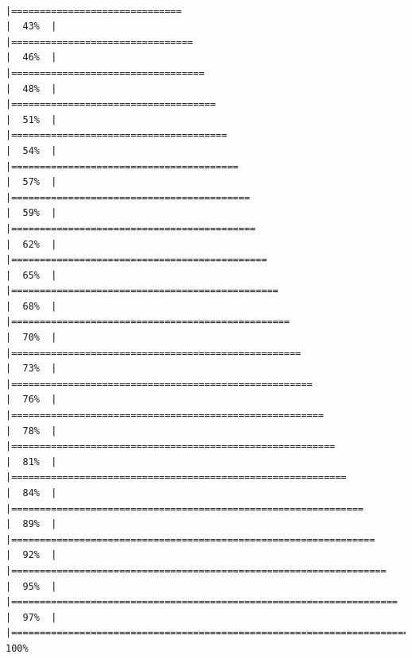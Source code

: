 \documentclass[
]{article}
\begin{document}
\begin{verbatim}
                                                                    |==============================                                        |  43%  |                                                                              |================================                                      |  46%  |                                                                              |==================================                                    |  48%  |                                                                              |====================================                                  |  51%  |                                                                              |======================================                                |  54%  |                                                                              |========================================                              |  57%  |                                                                              |==========================================                            |  59%  |                                                                              |===========================================                           |  62%  |                                                                              |=============================================                         |  65%  |                                                                              |===============================================                       |  68%  |                                                                              |=================================================                     |  70%  |                                                                              |===================================================                   |  73%  |                                                                              |=====================================================                 |  76%  |                                                                              |=======================================================               |  78%  |                                                                              |=========================================================             |  81%  |                                                                              |===========================================================           |  84%  |                                                                              |==============================================================        |  89%  |                                                                              |================================================================      |  92%  |                                                                              |==================================================================    |  95%  |                                                                              |====================================================================  |  97%  |                                                                              |======================================================================| 100%

\end{verbatim}
\end{document}
